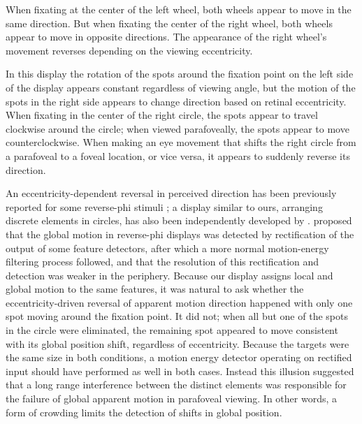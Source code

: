 \documentclass[manuscript]{subfiles}
\begin{document}
\begin{movie}
  \caption{When fixating at the center of the left wheel, both wheels appear to move in the same direction. But when fixating the center of the right wheel, both wheels appear to move in opposite directions. The appearance of the right wheel's movement reverses depending on the viewing eccentricity.}
  \label{mov:wheels}
\end{movie}

In this display the rotation of the spots around the fixation point on the left side of the display appears constant regardless of viewing angle, but the motion of the spots in the right side appears to change direction based on retinal eccentricity. When fixating in the center of the right circle, the spots appear to travel clockwise around the circle; when viewed parafoveally, the spots appear to move counterclockwise. When making an eye movement that shifts the right circle from a parafoveal to a foveal location, or vice versa, it appears to suddenly reverse its direction.

 An eccentricity-dependent reversal in perceived direction has been previously reported for some reverse-phi stimuli \citep{Mather:1985rt,Chubb:1989fj}; a display similar to ours, arranging discrete elements in circles, has also been independently developed by \citet{Shapiro:2008ek}. \citet{Chubb:1989fj} proposed that the global motion in reverse-phi displays was detected by rectification of the output of some feature detectors, after which a more normal motion-energy filtering process followed, and that the resolution of this rectification and detection was weaker in the periphery. Because our display assigns local and global motion to the same features, it was natural to ask whether the eccentricity-driven reversal of apparent motion direction happened with only one spot moving around the fixation point. It did not; when all but one of the spots in the circle were eliminated, the remaining spot appeared to move consistent with its global position shift, regardless of eccentricity. Because the targets were the same size in both conditions, a motion energy detector operating on rectified input should have performed as well in both cases. Instead this illusion suggested that a long range interference between the distinct elements was responsible for the failure of global apparent motion in parafoveal viewing. In other words, a form of crowding limits the detection of shifts in global position.
\end{document}
